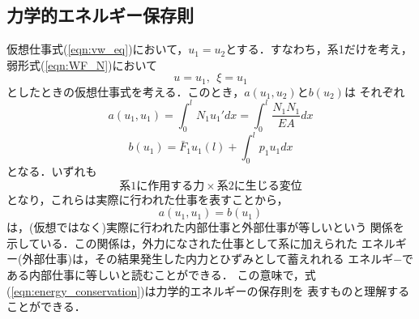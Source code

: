 \documentclass[10pt,a4j]{jarticle}
\begin{document}
\subsection{力学的エネルギー保存則}
仮想仕事式(\ref{eqn:vw_eq})において，$u_1=u_2$とする．すなわち，系1だけを考え，
弱形式(\ref{eqn:WF_N})において
\[
	u=u_1, \ \ \xi=u_1
\]
としたときの仮想仕事式を考える．このとき，$a(u_1,u_2)$と$b(u_2)$は
それぞれ
\begin{equation}
	a(u_1,u_1)=\int_0^l N_1u_1'dx = \int_0^l\frac{N_1N_1}{EA}dx
	\label{eqn:w_int}
\end{equation}
\begin{equation}
	b(u_1)=\bar F_1 u_1(l)+\int_0^l p_1 u_1dx
	\label{eqn:w_ext}
\end{equation}
となる．いずれも
\[
	系1に作用する力 \times 系2に生じる変位
\]
となり，これらは実際に行われた仕事を表すことから，
\begin{equation}
	a(u_1,u_1)=b(u_1)
	\label{eqn:energy_conservation}
\end{equation}
は，(仮想ではなく)実際に行われた内部仕事と外部仕事が等しいという
関係を示している．この関係は，外力になされた仕事として系に加えられた
エネルギー(外部仕事)は，その結果発生した内力とひずみとして蓄えれれる
エネルギ−である内部仕事に等しいと読むことができる．
この意味で，式(\ref{eqn:energy_conservation})は力学的エネルギーの保存則を
表すものと理解することができる．
\end{document}

